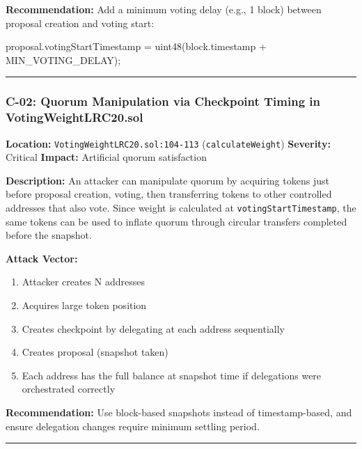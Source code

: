 \documentclass[
]{article}
\newenvironment{Shaded}{}{}
\newcommand{\NormalTok}[1]{#1}
\providecommand{\tightlist}{%
  \setlength{\itemsep}{0pt}\setlength{\parskip}{0pt}}
\begin{document}
\textbf{Recommendation:} Add a minimum voting delay (e.g., 1 block)
between proposal creation and voting start:

\begin{Shaded}
\begin{Highlighting}[]
\NormalTok{proposal.votingStartTimestamp = uint48(block.timestamp + MIN\_VOTING\_DELAY);}
\end{Highlighting}
\end{Shaded}

\begin{center}\rule{0.5\linewidth}{0.5pt}\end{center}

\subsubsection{C-02: Quorum Manipulation via Checkpoint Timing in
VotingWeightLRC20.sol}\label{c-02-quorum-manipulation-via-checkpoint-timing-in-votingweightlrc20sol}

\textbf{Location:} \texttt{VotingWeightLRC20.sol:104-113}
(\texttt{calculateWeight}) \textbf{Severity:} Critical \textbf{Impact:}
Artificial quorum satisfaction

\textbf{Description:} An attacker can manipulate quorum by acquiring
tokens just before proposal creation, voting, then transferring tokens
to other controlled addresses that also vote. Since weight is calculated
at \texttt{votingStartTimestamp}, the same tokens can be used to inflate
quorum through circular transfers completed before the snapshot.

\textbf{Attack Vector:}

\begin{enumerate}
\def\labelenumi{\arabic{enumi}.}
\tightlist
\item
  Attacker creates N addresses
\item
  Acquires large token position
\item
  Creates checkpoint by delegating at each address sequentially
\item
  Creates proposal (snapshot taken)
\item
  Each address has the full balance at snapshot time if delegations were
  orchestrated correctly
\end{enumerate}

\textbf{Recommendation:} Use block-based snapshots instead of
timestamp-based, and ensure delegation changes require minimum settling
period.

\begin{center}\rule{0.5\linewidth}{0.5pt}\end{center}
\end{document}
